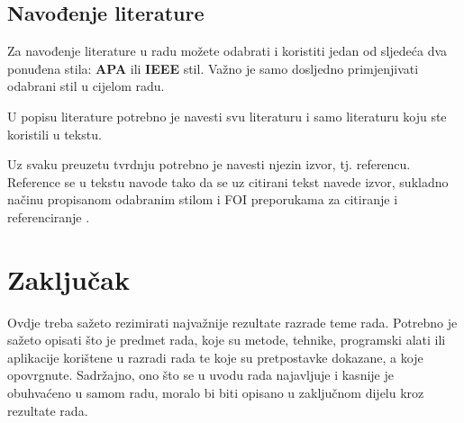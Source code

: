 \section{Navođenje literature}

Za navođenje literature u radu možete odabrati i koristiti jedan od sljedeća dva ponuđena stila: \textbf{APA} ili \textbf{IEEE} stil. Važno je samo dosljedno primjenjivati odabrani stil u cijelom radu.

U popisu literature potrebno je navesti svu literaturu i samo literaturu koju ste koristili u tekstu.

Uz svaku preuzetu tvrdnju potrebno je navesti njezin izvor, tj. referencu. Reference se u tekstu navode tako da se uz citirani tekst navede izvor, sukladno načinu propisanom odabranim stilom i FOI preporukama za citiranje i referenciranje \cite{SchattenEtAl2016roadmap}.

\chapter{Zaključak}

Ovdje treba sažeto rezimirati najvažnije rezultate razrade teme rada. Potrebno je sažeto opisati što je predmet rada, koje su metode, tehnike, programski alati ili aplikacije korištene u razradi rada te koje su pretpostavke dokazane, a koje opovrgnute. Sadržajno, ono što se u uvodu rada najavljuje i kasnije je obuhvaćeno u samom radu, moralo bi biti opisano u zaključnom dijelu kroz rezultate rada.

\lipsum[1-2]
